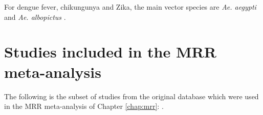 \documentclass[12pt]{article}
\begin{document}
{For dengue fever, chikungunya and Zika, the main vector species are \textit{Ae. aegypti} and \textit{Ae. albopictus} \citep{kraemer2015global,grard2014zika,benelli2016declining}. 


\section{Studies included in the MRR meta-analysis}\label{sec:appendix_mrrStudyList}
The following is the subset of studies from the original \cite{guerra2014global} database which were used in the MRR meta-analysis of Chapter \ref{chap:mrr}: \cite{marini2010study,baber2010population,lacroix2009dispersal,maciel2008calculating,midega2007estimating,maciel2007daily,elizondo2006gonotrophic,ba2005aspects,fabian2005mark,la2004anopheles,watson2000aedes,harrington2001analysis,tsuda2001movement,muir1998aedes,toure1998mark,quinones1997anopheles,costantini1996density,trpis1995estimates,jensen1994comparison,fernandez1994gonotrophic,jaal1992mark,rodriguez1992gonotrophic,chiang1991capture,jensen1991assessment,eldridge1990daily,macdonald1968mark,pumpuni1989population,charlwood1987mark,charlwood1989capture,birley1989effect,arredondo1998gonotrophic,hii1990estimation,renshaw1994host,milby1989estimation,maciel2007body,loong1990survival,nelson1980dispersal,maciel2006movement,mcdonald1977population,curtis1980preliminary,rawlings1982dispersal,conway1974population,reisen1979anopheles,nelson1978estimates,rawlings1981influence,sempala1981ecology,takagi1995movement,buei1980field,eyles1943experiment,ordonez2001use,pant1973field,charlwood1988evidence,reisen1982anopheles,nayar1980quantitative,carnevale1979etude,eyles1946long,reisen1984impact,charlwood1986capture,trpis1975demonstration,lutwama1994mark,wada1969dispersal,takken1998dispersal,abdel1966study,valerio2012dispersal,zetek1915behavior,takagi1995movement,yasuno1975migration,eyles1943measurement,germain1974evaluation}.

}
\end{document}

